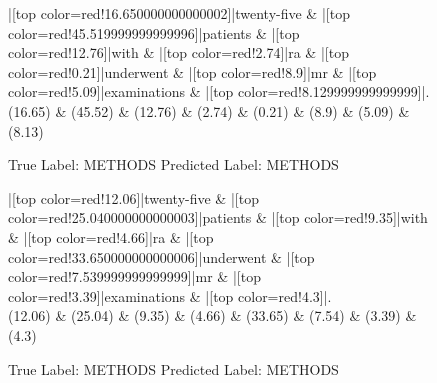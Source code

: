 \documentclass[a4paper, landscape]{article}
\begin{document}
\clearpage
\begin{figure}
\begin{center}
\begin{dependency}
\begin{deptext}
|[top color=red!16.650000000000002]|twenty-five \& |[top color=red!45.519999999999996]|patients \& |[top color=red!12.76]|with \& |[top color=red!2.74]|ra \& |[top color=red!0.21]|underwent \& |[top color=red!8.9]|mr \& |[top color=red!5.09]|examinations \& |[top color=red!8.129999999999999]|.\\
(16.65) \& (45.52) \& (12.76) \& (2.74) \& (0.21) \& (8.9) \& (5.09) \& (8.13)\\
\end{deptext}
\end{dependency}
\end{center}
\caption{True Label: METHODS Predicted Label: METHODS}
\end{figure}
\clearpage
\begin{figure}
\begin{center}
\begin{dependency}
\begin{deptext}
|[top color=red!12.06]|twenty-five \& |[top color=red!25.040000000000003]|patients \& |[top color=red!9.35]|with \& |[top color=red!4.66]|ra \& |[top color=red!33.650000000000006]|underwent \& |[top color=red!7.539999999999999]|mr \& |[top color=red!3.39]|examinations \& |[top color=red!4.3]|.\\
(12.06) \& (25.04) \& (9.35) \& (4.66) \& (33.65) \& (7.54) \& (3.39) \& (4.3)\\
\end{deptext}
\end{dependency}
\end{center}
\caption{True Label: METHODS Predicted Label: METHODS}
\end{figure}
\clearpage
\end{document}
